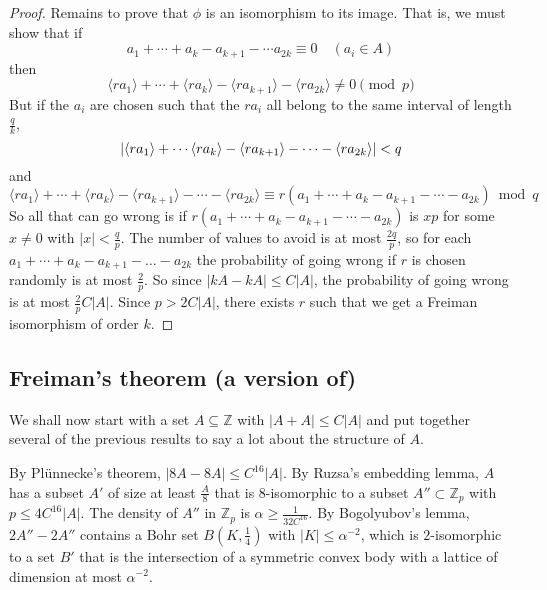 \documentclass{article}
\newcommand{\1}[1]{\mathbbm{1}_{#1}}
\begin{document}
\begin{proof}
  Remains to prove that $\phi$ is an isomorphism to its image. That is, we must show that if
 \begin{equation*}
    a_1 + \dotsb + a_k - a_{k+1} - \dotsb a_{2k} \equiv 0 \quad (a_i \in A)
  \end{equation*}
  then
  \begin{equation*}
    \langle r a_1 \rangle + \dotsb + \langle r a_k \rangle - \langle r a_{k+1} \rangle - \langle r a_{2k} \rangle \neq 0 \pmod{p}
  \end{equation*}
  But if the $a_i$ are chosen such that the $r a_i$ all belong to the same interval of length $\frac{q}{k}$,
  \begin{equation*}
    |\langle r a_1 \rangle + \dotsb \langle r a_k \rangle - \langle r a_{k+1} \rangle - \dotsb - \langle r a_{2k} \rangle| < q \\
  \end{equation*}
  and
  \begin{equation*}
    \langle r a_1 \rangle + \dotsb + \langle r a_k \rangle - \langle r a_{k+1} \rangle - \dotsb - \langle r a_{2k} \rangle \equiv r(a_1 + \dotsb + a_k - a_{k+1} - \dotsb - a_{2k}) \bmod{q}
  \end{equation*}
  So all that can go wrong is if $r(a_1 + \dotsb + a_k - a_{k+1} - \dotsb - a_{2k})$ is $xp$ for some $x \neq 0$ with $|x| < \frac{q}{p}$.
  The number of values to avoid is at most $\frac{2q}{p}$, so for each $a_1 + \dotsb + a_k - a_{k+1} - \dotsc - a_{2k}$ the probability of going wrong if $r$ is chosen randomly is at most $\frac{2}{p}$.
  So since $|kA - kA| \leq C|A|$, the probability of going wrong is at most $\frac{2}{p} C |A|$.
  Since $p > 2 C |A|$, there exists $r$ such that we get a Freiman isomorphism of order $k$.
\end{proof}

\subsection{Freiman's theorem (a version of)}
We shall now start with a set $A \subseteq \mathbb{Z}$ with $|A+A| \leq C|A|$ and put together several of the previous results to say a lot about the structure of $A$.

By Pl\"unnecke's theorem, $|8A - 8A| \leq C^{16}|A|$. By Ruzsa's embedding lemma, $A$ has a subset $A'$ of size at least $\frac{A}{8}$ that is $8$-isomorphic to a subset $A'' \subset \mathbb{Z}_p$ with $p \leq 4 C^{16} |A|$.
The density of $A''$ in $\mathbb{Z}_p$ is $\alpha \geq \frac{1}{32 C^{16}}$.
By Bogolyubov's lemma, $2A'' - 2A''$ contains a Bohr set $B(K, \frac{1}{4})$ with $|K| \leq \alpha^{-2}$, which is $2$-isomorphic to a set $B'$ that is the intersection of a symmetric convex body with a lattice of dimension at most $\alpha^{-2}$.
\end{document}
